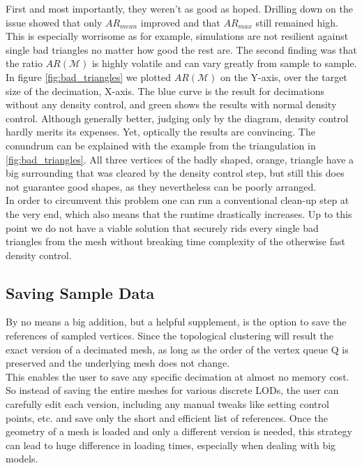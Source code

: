 First and most importantly, they weren't as good as hoped.
Drilling down on the issue showed that only $AR_{mean}$ improved and that $AR_{max}$ still remained high.
This is especially worrisome as for example, simulations are not resilient against single bad triangles no matter how good the rest are.
The second finding was that the ratio $AR(\mathcal{M})$ is highly volatile and can vary greatly from sample to sample.\\
In figure \ref{fig:bad_triangles} we plotted $AR(\mathcal{M})$ on the Y-axis, over the target size of the decimation, X-axis.
The blue curve is the result for decimations without any density control, and green shows the results with normal density control.
Although generally better, judging only by the diagram, density control hardly merits its expenses.
Yet, optically the results are convincing.
The conundrum can be explained with the example from the triangulation in \ref{fig:bad_triangles}.
All three vertices of the badly shaped, orange, triangle have a big surrounding that was cleared by the density control step, but still this does not guarantee good shapes, as they nevertheless can be poorly arranged.\\
In order to circumvent this problem one can run a conventional clean-up step at the very end, which also means that the runtime drastically increases.
Up to this point we do not have a viable solution that securely rids every single bad triangles from the mesh without breaking time complexity of the otherwise fast density control.


\subsection{Saving Sample Data}
\label{topstoc123}

By no means a big addition, but a helpful supplement, is the option to save the references of sampled vertices.
Since the topological clustering will result the exact version of a decimated mesh, as long as the order of the vertex queue $\mathrm{Q}$ is preserved and the underlying mesh does not change.\\
This enables the user to save any specific decimation at almost no memory cost.
So instead of saving the entire meshes for various discrete LODs, the user can carefully edit each version, including any manual tweaks like setting control points, etc. and save only the short and efficient list of references.
Once the geometry of a mesh is loaded and only a different version is needed, this strategy can lead to huge difference in loading times, especially when dealing with big models.


